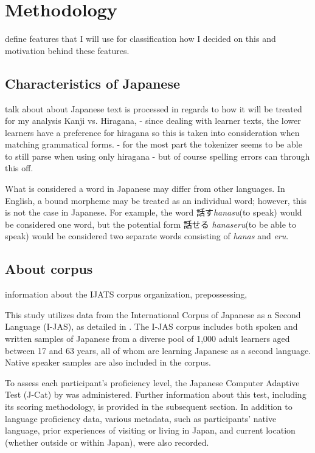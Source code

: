 \chapter{Methodology}
define  features that I will use for classification how I decided on this and motivation behind these features.

\section{Characteristics of Japanese}
talk about about Japanese text is processed in regards to how it will be treated for my analysis
   Kanji vs. Hiragana, - since dealing with learner texts, the lower learners have a preference for hiragana so this
is taken into consideration when matching grammatical forms. - for the most part the tokenizer seems to be able to
still parse when using only hiragana - but of course spelling errors can through this off.

What is considered a word in Japanese may differ from other languages. In English, a bound morpheme may be treated as an individual word; however, this is not the case in Japanese. For example, the word 話す\textit{hanasu}(to speak) would be considered one word, but the potential form 話せる \textit{hanaseru}(to be able to speak) would be considered two separate words consisting of \textit{hanas} and \textit{eru}.

\section{About corpus}
information about the IJATS corpus organization, prepossessing,

This study utilizes data from the International Corpus of Japanese as a Second Language (I-JAS), as detailed in \citet{Sakoda2020}.  The I-JAS corpus includes both spoken and written samples of Japanese from a diverse pool of 1,000 adult learners aged between 17 and 63 years, all of whom are learning Japanese as a second language. Native speaker samples are also included in the corpus.

To assess each participant's proficiency level, the Japanese Computer Adaptive Test (J-Cat) by \citet{Imai2009} was administered. Further information about this test, including its scoring methodology, is provided in the subsequent section. In addition to language proficiency data, various metadata, such as participants' native language, prior experiences of visiting or living in Japan, and current location (whether outside or within Japan), were also recorded.

